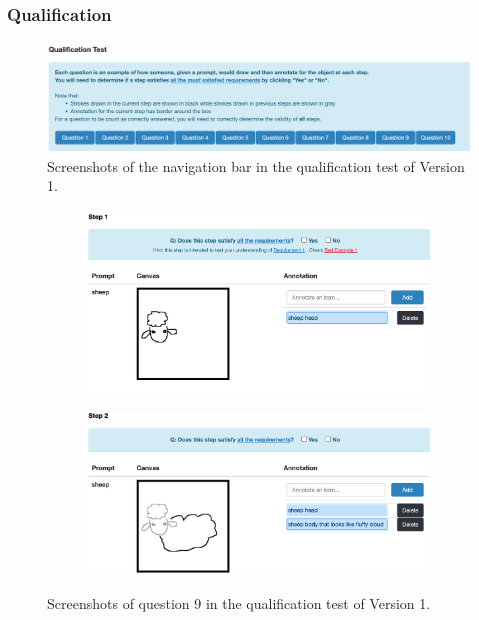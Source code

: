 
\subsubsection{Qualification}

\begin{figure}[!htb]
\includegraphics[width=\linewidth]{data_collection/v1_qual_header.png}  
\caption{Screenshots of the navigation bar in the qualification test of Version 1.}
\label{v1.qualification.nav}
\end{figure}

\begin{figure}[!htb]
\begin{subfigure}{\textwidth}
\centering
\includegraphics[width=.8\linewidth]{data_collection/v1_qual_q9_1.png}  
\end{subfigure}
\newline
\begin{subfigure}{\textwidth}
\centering
\includegraphics[width=.8\linewidth]{data_collection/v1_qual_q9_2.png}  
\end{subfigure}
\caption{Screenshots of question 9 in the qualification test of Version 1.}
\label{v1.qualification.q9}
\end{figure}

